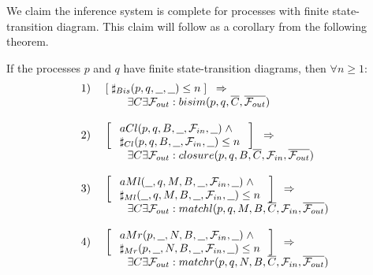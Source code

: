 We claim the inference system is complete for processes with finite state-transition diagram. This claim will follow as a corollary from the following theorem.

\begin{theorem}\label{theoCompleteness}
If the processes $p$ and $q$ have finite state-transition diagrams, then $\forall n\geq 1$:
\[
\begin{array}{llll}
\mbox{1) } &
\multicolumn{3}{l}{\left[\;
\sharp_{Bis}(p,q,\underline{\ \ },\underline{\ \ }) \leq n
\;\right]\;\;\Rightarrow}\\
&&& \exists C\exists {\cal F}_{out}: bisim(p,q,\overline{C},\overline{{\cal F}_{out}})\\
\\

\mbox{2) } &
\multicolumn{3}{l}{\left[\;
\begin{array}{l}
aCl(p,q,B,\underline{\ \ },{\cal F}_{in},\underline{\ \ })\;\wedge\\
\sharp_{Cl}(p,q,B,\underline{\ \ },{\cal F}_{in},\underline{\ \ }) \leq n
\end{array}
\;\right]\;\;\Rightarrow}\\
&&& \exists C\exists {\cal F}_{out}: closure(p,q,B,\overline{C},{\cal F}_{in},\overline{{\cal F}_{out}})\\
\\

\mbox{3) } &
\multicolumn{3}{l}{\left[\;
\begin{array}{l}
aMl(\underline{\ \ },q,M,B,\underline{\ \ },{\cal F}_{in},\underline{\ \ })\;\wedge\\
\sharp_{Ml}(\underline{\ \ },q,M,B,\underline{\ \ },{\cal F}_{in},\underline{\ \ }) \leq n
\end{array}
\;\right]\;\;\Rightarrow}\\
&&& \exists C\exists {\cal F}_{out}: matchl(p,q,M,B,\overline{C},{\cal F}_{in},\overline{{\cal F}_{out}})\\
\\

\mbox{4) } &
\multicolumn{3}{l}{\left[\;
\begin{array}{l}
aMr(p,\underline{\ \ },N,B,\underline{\ \ },{\cal F}_{in},\underline{\ \ })\;\wedge\\
\sharp_{Mr}(p,\underline{\ \ },N,B,\underline{\ \ },{\cal F}_{in},\underline{\ \ }) \leq n
\end{array}
\;\right]\;\;\Rightarrow}\\
&&& \exists C\exists {\cal F}_{out}: matchr(p,q,N,B,\overline{C},{\cal F}_{in},\overline{{\cal F}_{out}})\\
\\


\end{array}\]
\end{theorem}
